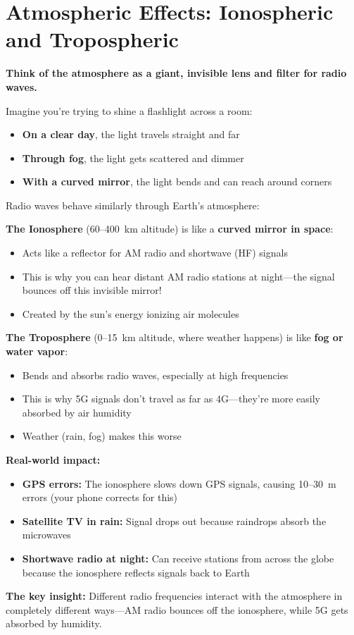 \chapter{Atmospheric Effects: Ionospheric and Tropospheric}
\label{ch:atmospheric}

\begin{nontechnical}
\textbf{Think of the atmosphere as a giant, invisible lens and filter for radio waves.}

Imagine you're trying to shine a flashlight across a room:
\begin{itemize}
\item \textbf{On a clear day}, the light travels straight and far
\item \textbf{Through fog}, the light gets scattered and dimmer
\item \textbf{With a curved mirror}, the light bends and can reach around corners
\end{itemize}

Radio waves behave similarly through Earth's atmosphere:

\textbf{The Ionosphere} (60--400~km altitude) is like a \textbf{curved mirror in space}:
\begin{itemize}
\item Acts like a reflector for AM radio and shortwave (HF) signals
\item This is why you can hear distant AM radio stations at night---the signal bounces off this invisible mirror!
\item Created by the sun's energy ionizing air molecules
\end{itemize}

\textbf{The Troposphere} (0--15~km altitude, where weather happens) is like \textbf{fog or water vapor}:
\begin{itemize}
\item Bends and absorbs radio waves, especially at high frequencies
\item This is why 5G signals don't travel as far as 4G---they're more easily absorbed by air humidity
\item Weather (rain, fog) makes this worse
\end{itemize}

\textbf{Real-world impact:}
\begin{itemize}
\item \textbf{GPS errors:} The ionosphere slows down GPS signals, causing 10--30~m errors (your phone corrects for this)
\item \textbf{Satellite TV in rain:} Signal drops out because raindrops absorb the microwaves
\item \textbf{Shortwave radio at night:} Can receive stations from across the globe because the ionosphere reflects signals back to Earth
\end{itemize}

\textbf{The key insight:} Different radio frequencies interact with the atmosphere in completely different ways---AM radio bounces off the ionosphere, while 5G gets absorbed by humidity.
\end{nontechnical}

